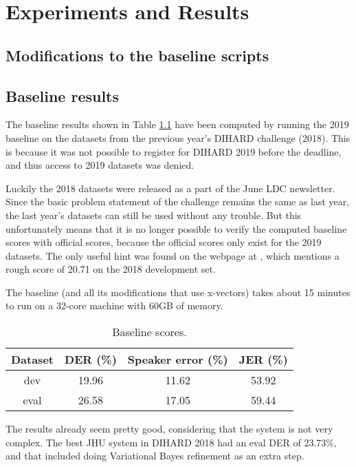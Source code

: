 \chapter{Experiments and Results}
	\section{Modifications to the baseline scripts}
	
	\section{Baseline results}
	The baseline results shown in Table \ref{table-baseline-scores} have been computed by running the 2019 baseline on the datasets from the previous year's DIHARD challenge (2018). This is because it was not possible to register for DIHARD 2019 before the deadline, and thus access to 2019 datasets was denied.
	
	Luckily the 2018 datasets were released as a part of the June LDC newsletter. Since the basic problem statement of the challenge remains the same as last year, the last year's datasets can still be used without any trouble. But this unfortunately means that it is no longer possible to verify the computed baseline scores with official scores, because the official scores only exist for the 2019 datasets. The only useful hint was found on the webpage at \cite{dihard2-unofficial}, which mentions a rough score of 20.71 on the 2018 development set.
	
	The baseline (and all its modifications that use x-vectors) takes about 15 minutes to run on a 32-core machine with 60GB of memory.
	
	\begin{table}[h]
		\centering
		\begin{tabular}{|c|c|c|c|}
			\hline
			Dataset & DER (\%) & Speaker error (\%) & JER (\%) \\
			\hline
			dev & 19.96 & 11.62 & 53.92 \\
			\hline
			eval & 26.58 & 17.05 & 59.44 \\
			\hline
		\end{tabular}
	\caption{Baseline scores.}
	\label{table-baseline-scores}
	\end{table}
	
	The results already seem pretty good, considering that the system is not very complex. The best JHU system in DIHARD 2018 had an eval DER of 23.73\%, and that included doing Variational Bayes refinement as an extra step.

